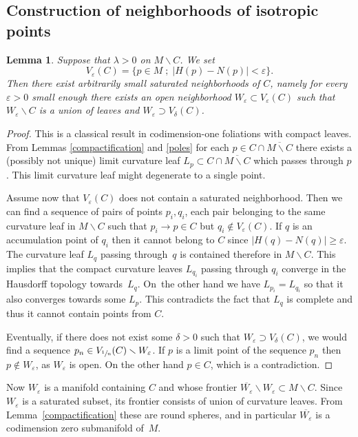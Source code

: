 \documentclass[10pt]{amsart}
\let\moins\smallsetminus
\let\epsilon\varepsilon
\newcommand{\sep}{\;;\;}
\newtheorem{lemma}[theorem]{Lemma}
\theoremstyle{definition}
\theoremstyle{remark}
\numberwithin{equation}{section}
\let\Subsection\subsection\let\Subsubsection\subsubsection
\begin{document}
\Subsection{Construction of neighborhoods of isotropic points}
\begin{lemma}\label{saturated}
Suppose that $\lambda> 0$ on $M\moins C$. We set $$V_{\epsilon}(C)=\{p\in M\sep |H(p)-N(p)| < \epsilon\}.$$
Then there exist arbitrarily small saturated neighborhoods of $C$, namely for every $\varepsilon >0$ small enough
there exists an open neighborhood $W_{\varepsilon}\subset V_{\varepsilon}(C)$ such that $W_{\varepsilon}\moins C$ is a union of leaves and
$W_{\varepsilon}\supset V_{\delta}(C)$.
\end{lemma}
\begin{proof}
This is a classical result in codimension-one foliations with compact leaves.
From Lemmas \ref{compactification} and \ref{poles} for each
$p\in C\cap \overline{M\moins C}$ there exists a (possibly not unique) limit curvature leaf $L_p\subset C\cap \overline{M\moins C}$ which passes through $p$.
This limit curvature leaf might degenerate to a single point.

Assume now that $V_{\varepsilon}(C)$ does not contain a saturated neighborhood. Then
we can find a sequence of pairs of points $p_i,q_i$, each pair belonging to the
same curvature leaf in $M\moins C$ such that $p_i\to p\in C$ but
$q_i\not\in V_{\varepsilon}(C)$. If $q$ is an accumulation point of $q_i$ then it cannot belong to $C$ since $|H(q)-N(q)| \geq \varepsilon$. The curvature leaf $L_q$ passing
through~$q$ is contained therefore in $M\moins C$. This implies that
the compact curvature leaves $L_{q_i}$ passing through $q_i$ converge
in the Hausdorff topology towards~$L_q$.
On~the other hand we have
$L_{p_i}=L_{q_i}$ so that it also converges towards some $L_p$.
This contradicts the fact that
$L_q$ is complete and thus it cannot contain points from $C$.

Eventually, if there does not exist some $\delta>0$ such that $W_{\varepsilon}\supset V_{\delta}(C)$,
we would find a sequence $p_n\in V_{\sfrac{1}{n}}(C)\moins W_{\varepsilon}$. If $p$ is a limit point of the sequence $p_n$ then
$p\not\in W_{\varepsilon}$, as $W_{\varepsilon}$ is open. On the other hand $p\in C$, which is a contradiction.
\end{proof}

Now $W_{\varepsilon}$ is a manifold containing $C$ and whose frontier
$\overline{W_{\varepsilon}}\moins W_{\varepsilon}\subset M\moins C$.
Since $W_{\varepsilon}$ is a saturated subset, its frontier consists of union of curvature leaves.
From Lemma~\ref{compactification} these are round spheres, and in particular $\overline{W_{\varepsilon}}$ is
a codimension zero submanifold of~$M$.
\end{document}
